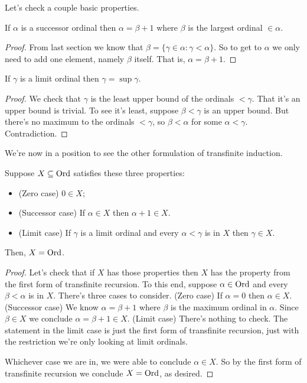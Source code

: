 \documentclass[10pt]{amsart}
\begin{document}
Let's check a couple basic properties.

\begin{proposition}
If $\alpha$ is a successor ordinal then $\alpha = \beta + 1$ where $\beta$ is the largest ordinal $\in \alpha$.
\end{proposition}

\begin{proof}
From last section we know that $\beta = \{ \gamma \in \alpha : \gamma < \alpha \}$. So to get to $\alpha$ we only need to add one element, namely $\beta$ itself. That is, $\alpha = \beta + 1$.
\end{proof}

\begin{proposition}
If $\gamma$ is a limit ordinal then $\gamma = \sup \gamma$.
\end{proposition}

\begin{proof}
We check that $\gamma$ is the least upper bound of the ordinals $< \gamma$. That it's an upper bound is trivial. To see it's least, suppose $\beta < \gamma$ is an upper bound. But there's no maximum to the ordinals $< \gamma$, so $\beta < \alpha$ for some $\alpha < \gamma$. Contradiction.
\end{proof}

We're now in a position to see the other formulation of transfinite induction.

\begin{theorem}
Suppose $X \subseteq \mathrm{Ord}$ satisfies these three properties:
\begin{itemize}
\item (Zero case) $0 \in X$;
\item (Successor case) If $\alpha \in X$ then $\alpha + 1 \in X$.
\item (Limit case) If $\gamma$ is a limit ordinal and every $\alpha < \gamma$ is in $X$ then $\gamma \in X$. 
\end{itemize}
Then, $X = \mathrm{Ord}$.
\end{theorem}

\begin{proof}
Let's check that if $X$ has those properties then $X$ has the property from the first form of transfinite recursion. To this end, suppose $\alpha \in \mathrm{Ord}$ and every $\beta < \alpha$ is in $X$. There's three cases to consider. (Zero case) If $\alpha = 0$ then $\alpha \in X$. (Successor case) We know $\alpha = \beta + 1$ where $\beta$ is the maximum ordinal in $\alpha$. Since $\beta \in X$ we conclude $\alpha = \beta + 1 \in X$. (Limit case) There's nothing to check. The statement in the limit case is just the first form of transfinite recursion, just with the restriction we're only looking at limit ordinals.

Whichever case we are in, we were able to conclude $\alpha \in X$. So by the first form of transfinite recursion we conclude $X = \mathrm{Ord}$, as desired.
\end{proof}
\end{document}
